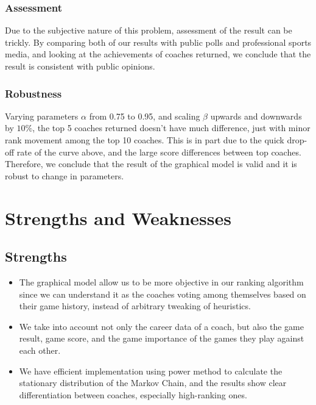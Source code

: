 \documentclass[titlepage,12pt]{article}
\begin{document}
\subsubsection*{Assessment}

\noindent Due to the subjective nature of this problem, assessment of the result can be trickly. By comparing both of our results with public polls and professional sports media, and looking at the achievements of coaches returned, we conclude that the result is consistent with public opinions.

\subsubsection*{Robustness}

\noindent Varying parameters $\alpha$ from 0.75 to 0.95, and scaling $\beta$ upwards and downwards by $10\%$, the top 5 coaches returned doesn't have much difference, just with minor rank movement among the top 10 coaches. This is in part due to the quick drop-off rate of the curve above, and the large score differences between top coaches. Therefore, we conclude that the result of the graphical model is valid and it is robust to change in parameters.

\section{Strengths and Weaknesses}

\subsection{Strengths}
\begin{itemize}
\item The graphical model allow us to be more objective in our ranking algorithm since we can understand it as the coaches voting among themselves based on their game history, instead of arbitrary tweaking of heuristics.

\item We take into account not only the career data of a coach, but also the game result, game score, and the game importance of the games they play against each other.

\item We have efficient implementation using power method to calculate the stationary distribution of the Markov Chain, and the results show clear differentiation between coaches, especially high-ranking ones.
\end{itemize}
\end{document}
